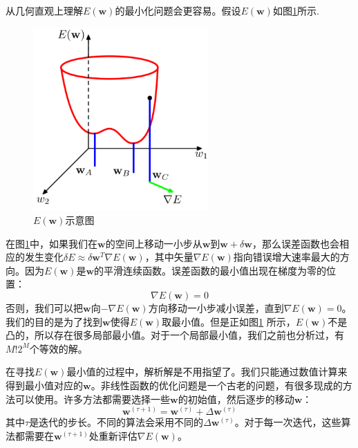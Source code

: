\documentclass[10pt,a4paper,UTF8]{article}
\begin{document}
从几何直观上理解\(E(\mathbf{w})\)的最小化问题会更容易。假设\(E(\mathbf{w})\)如图\ref{fig:orge965570}所示.
\begin{figure}[htbp]
\centering
\includegraphics[width=0.6\textwidth]{../../img/computer_prml/20170702errorfunction.png}
\caption{\label{fig:orge965570}
\(E(\mathbf{w})\)示意图}
\end{figure}

在图\ref{fig:orge965570}中，如果我们在\(\mathbf{w}\)的空间上移动一小步从\(\mathbf{w}\)到\(\mathbf{w} + \delta \mathbf{w}\)，那么误差函数也会相应的发生变化\(\delta E \approx \delta \mathbf{w}^{T}\nabla E(\mathbf{w})\)，其中矢量\(\nabla E(\mathbf{w})\)指向错误增大速率最大的方向。因为\(E(\mathbf{w})\)是\(\mathbf{w}\)的平滑连续函数。误差函数的最小值出现在梯度为零的位置：
\begin{equation}
\label{eq:20}
\nabla E(\mathbf{w}) = 0
\end{equation}
否则，我们可以把\(\mathbf{w}\)向\(-\nabla E(\mathbf{w})\)方向移动一小步减小误差，直到\(\nabla E(\mathbf{w}) = 0\)。我们的目的是为了找到\(\mathbf{w}\)使得\(E(\mathbf{w})\)取最小值。但是正如图\ref{fig:orge965570} 所示，\(E(\mathbf{w})\)不是凸的，所以存在很多局部最小值。对于一个局部最小值，我们之前也分析过，有\(M!2^{M}\)个等效的解。

在寻找\(E(\mathbf{w})\)最小值的过程中，解析解是不用指望了。我们只能通过数值计算来得到最小值对应的\(\mathbf{w}\)。非线性函数的优化问题是一个古老的问题，有很多现成的方法可以使用。许多方法都需要选择一些\(\mathbf{w}\)的初始值，然后逐步的移动\(\mathbf{w}\)：
\begin{equation}
\label{eq:21}
\mathbf{w}^{(\tau +1)} = \mathbf{w}^{(\tau)} + \Delta \mathbf{w}^{(\tau)}
\end{equation}
其中\(\tau\)是迭代的步长。不同的算法会采用不同的\(\Delta \mathbf{w}^{(\tau)}\)。对于每一次迭代，这些算法都需要在\(\mathbf{w}^{(\tau +1)}\)处重新评估\(\nabla E(\mathbf{w})\)。
\end{document}
